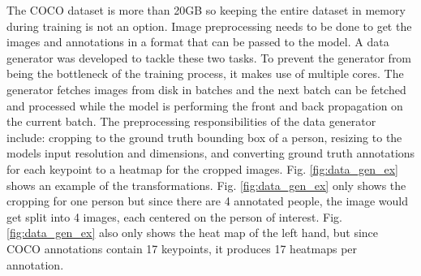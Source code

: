 \documentclass[11pt, letterpaper]{article}
\begin{document}
The COCO dataset is more than 20GB so keeping the entire dataset in memory during training is not an option. Image preprocessing needs to be done to get the images and annotations in a format that can be passed to the model. A data generator was developed to tackle these two tasks. To prevent the generator from being the bottleneck of the training process, it makes use of multiple cores. The generator fetches images from disk in batches and the next batch can be fetched and processed while the model is performing the front and back propagation on the current batch. The preprocessing responsibilities of the data generator include: cropping to the ground truth bounding box of a person, resizing to the models input resolution and dimensions, and converting ground truth annotations for each keypoint to a heatmap for the cropped images. Fig. \ref{fig:data_gen_ex} shows an example of the transformations. Fig. \ref{fig:data_gen_ex} only shows the cropping for one person but since there are 4 annotated people, the image would get split into 4 images, each centered on the person of interest. Fig. \ref{fig:data_gen_ex} also only shows the heat map of the left hand, but since COCO annotations contain 17 keypoints, it produces 17 heatmaps per annotation. 
\end{document}
